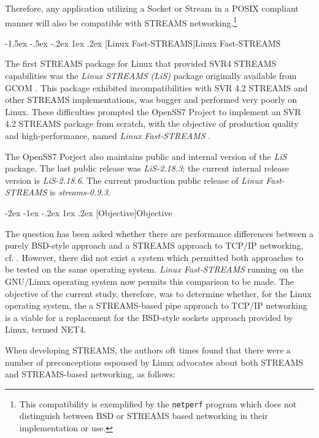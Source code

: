 \documentclass[letterpaper,final,notitlepage,twocolumn,10pt,twoside]{article}
\makeatletter
\renewcommand\section{\@startsection {section}{1}{\z@}%
                                   {-2ex \@plus -1ex \@minus -.2ex}%
                                   {1ex \@plus .2ex}%
                                   {\normalfont\large\bfseries}}
\renewcommand\subsection{\@startsection{subsection}{2}{\z@}%
                                     {-1.5ex \@plus -.5ex \@minus -.2ex}%
                                     {1ex \@plus .2ex}%
                                     {\normalfont\normalsize\bfseries}}
\makeatother
\begin{document}
Therefore, any application utilizing a Socket or Stream in a POSIX compliant
manner will also be compatible with STREAMS networking.\footnote{This
compatibility is exemplified by the \texttt{netperf} program which does not
distinguish between BSD or STREAMS based networking in their implementation or
use.}

\subsection[Linux Fast-STREAMS]{Linux Fast-STREAMS}

The first STREAMS package for Linux that provided SVR4 STREAMS capabilities
was the \textsl{Linux STREAMS (LiS)} package originally available from GCOM
\cite[]{LiS}.  This package exhibited incompatibilities with SVR 4.2 STREAMS
and other STREAMS implementations, was bugger and performed very poorly on
Linux.  These difficulties prompted the OpenSS7 Project \cite[]{openss7} to
implement an SVR 4.2 STREAMS package from scratch, with the objective of
production quality and high-performance, named \textsl{Linux Fast-STREAMS}
\cite[]{LfS}.

The OpenSS7 Porject also maintains public and internal version of the
\textsl{LiS} package.  The last public release was \textit{LiS-2.18.3}; the
current internal release version is \textit{LiS-2.18.6}.  The current
production public release of \textsl{Linux Fast-STREAMS} is
\textit{streams-0.9.3}.

\section[Objective]{Objective}

The question has been asked whether there are performance differences between
a purely BSD-style approach and a STREAMS approach to TCP/IP networking, cf.
\cite[]{demux}.  However, there did not exist a system which permitted both
approaches to be tested on the same operating system.  \textsl{Linux
Fast-STREAMS} running on the GNU/Linux operating system now permits this
comparison to be made.  The objective of the current study, therefore, was to
determine whether, for the Linux operating system, the a STREAMS-based pipe
approach to TCP/IP networking is a viable for a replacement for the BSD-style
sockets approach provided by Linux, termed NET4.

When developing STREAMS, the authors oft times found that there were a number
of preconceptions espoused by Linux advocates about both STREAMS and
STREAMS-based networking, as follows:
\end{document}

